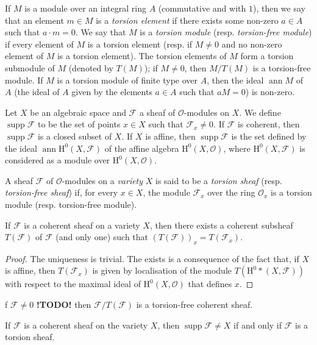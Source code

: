 \documentclass{article}
\theoremstyle{plain}
\newenvironment{proposition}[1]
    {\renewcommand\theinnercustomproposition{#1}\innercustomproposition}
    {\endinnercustomproposition}
\newenvironment{corollary}[1]
    {\renewcommand\theinnercustomcorollary{#1}\innercustomcorollary}
    {\endinnercustomcorollary}
\theoremstyle{definition}
\newcommand{\sh}{\mathscr}
\newcommand{\HH}{\mathrm{H}}
\DeclareMathOperator{\ann}{ann}
\DeclareMathOperator{\supp}{supp}
\newcommand{\todo}{\textbf{ !TODO! }}
\newcommand{\oldpage}[1]{\marginpar{\footnotesize$\Big\vert$ \textit{p.~#1}}}
\begin{document}
\cite{4,5,6}
\medskip

If $M$ is a module over an integral ring $A$ (commutative and with $1$), then we say that an element $m\in M$ is a \emph{torsion element} if there exists some non-zero $a\in A$ such that $a\cdot m=0$.
We say that $M$ is a \emph{torsion module} (resp. \emph{torsion-free module}) if every element of $M$ is a torsion element (resp. if $M\neq0$ and no non-zero element of $M$ is a torsion element).
The torsion elements of $M$ form a torsion submodule of $M$ (denoted by $T(M)$);
if $M\neq0$, then $M/T(M)$ is a torsion-free module.
If $M$ is a torsion module of finite type over $A$, then the ideal $\ann M$ of $A$ (the ideal of $A$ given by the elements $a\in A$ such that $aM=0$) is non-zero.

Let $X$ be an algebraic space and $\sh{F}$ a sheaf of $\sh{O}$-modules on $X$.
We define $\supp\sh{F}$ to be the set of points $x\in X$ such that $\sh{F}_x\neq0$.
If $\sh{F}$ is coherent, then $\supp\sh{F}$ is a closed subset of $X$.
If $X$ is affine, then $\supp\sh{F}$ is the set defined by the ideal $\ann\HH^0(X,\sh{F})$ of the affine algebra $\HH^0(X,\sh{O})$, where $\HH^0(X,\sh{F})$ is considered as a module over $\HH^0(X,\sh{O})$.

A sheaf $\sh{F}$ of $\sh{O}$-modules on a \emph{variety} $X$ is said to be a \emph{torsion sheaf} (resp. \emph{torsion-free sheaf}) if, for every $x\in X$, the module $\sh{F}_x$ over the ring $\sh{O}_x$ is a torsion module (resp. torsion-free module).

\oldpage{4-02}
\begin{proposition}{1}
\label{proposition1}
  If $\sh{F}$ is a coherent sheaf on a variety $X$, then there exists a coherent subsheaf $T(\sh{F})$ of $\sh{F}$ (and only one) such that $(T(\sh{F}))_x = T(\sh{F}_x)$.
\end{proposition}

\begin{proof}
  The uniqueness is trivial.
  The exists is a consequence of the fact that, if $X$ is affine, then $T(\sh{F}_x)$ is given by localisation of the module $T(\HH^0*(X,\sh{F}))$ with respect to the maximal ideal of $\HH^0(X,\sh{O})$ that defines $x$.
\end{proof}

\begin{corollary}
  If $\sh{F}\neq0$ \todo then $\sh{F}/T(\sh{F})$ is a torsion-free coherent sheaf.
\end{corollary}

\begin{proposition}{2}
\label{proposition2}
  If $\sh{F}$ is a coherent sheaf on the variety $X$, then $\supp\sh{F}\neq X$ if and only if $\sh{F}$ is a torsion sheaf.
\end{proposition}
\end{document}
